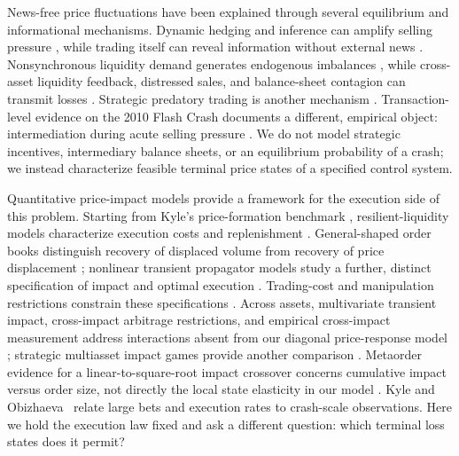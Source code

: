 \documentclass[review,hidelinks,onefignum,onetabnum]{siamonline250211}
\begin{document}
News-free price fluctuations have been explained through several equilibrium and informational mechanisms. Dynamic hedging and inference can amplify selling pressure \citep{GennotteLeland1990}, while trading itself can reveal information without external news \citep{Romer1993}. Nonsynchronous liquidity demand generates endogenous imbalances \citep{HuangWang2009}, while cross-asset liquidity feedback, distressed sales, and balance-sheet contagion can transmit losses \citep{CespaFoucault2014,ContWagalath2013,ContSchaanning2017}. Strategic predatory trading is another mechanism \citep{BrunnermeierPedersen2005}. Transaction-level evidence on the 2010 Flash Crash documents a different, empirical object: intermediation during acute selling pressure \citep{KirilenkoEtAl2017}. We do not model strategic incentives, intermediary balance sheets, or an equilibrium probability of a crash; we instead characterize feasible terminal price states of a specified control system.

Quantitative price-impact models provide a framework for the execution side of this problem. Starting from Kyle's price-formation benchmark \citep{Kyle1985}, resilient-liquidity models characterize execution costs and replenishment \citep{ObizhaevaWang2013,AlfonsiSchied2010}. General-shaped order books distinguish recovery of displaced volume from recovery of price displacement \citep{AlfonsiFruthSchied2010}; nonlinear transient propagator models study a further, distinct specification of impact and optimal execution \citep{CuratoGatheralLillo2017}. Trading-cost and manipulation restrictions constrain these specifications \citep{Gatheral2010,AlfonsiSchiedSlynko2012,HubermanStanzl2004}. Across assets, multivariate transient impact, cross-impact arbitrage restrictions, and empirical cross-impact measurement address interactions absent from our diagonal price-response model \citep{AlfonsiKlockSchied2016,SchneiderLillo2019,BenzaquenEtAl2017}; strategic multiasset impact games provide another comparison \citep{CordoniLillo2024}. Metaorder evidence for a linear-to-square-root impact crossover concerns cumulative impact versus order size, not directly the local state elasticity in our model \citep{BucciEtAl2019}. Kyle and Obizhaeva~\citep{KyleObizhaeva2023} relate large bets and execution rates to crash-scale observations. Here we hold the execution law fixed and ask a different question: which terminal loss states does it permit?
\end{document}
